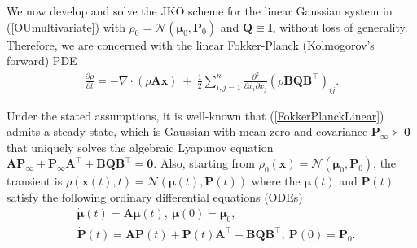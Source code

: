 \documentclass[letterpaper,10pt,twocolumn,conference]{ieeeconf}
\newcommand{\bbx}{{\bm{x}}}
\newcommand{\bbmu}{\bm{\mu}}
\newcommand{\bbP}{\bm{P}}
\begin{document}
We now develop and solve the JKO scheme for the linear Gaussian system in (\ref{OUmultivariate}) with $\rho_{0} = \mathcal{N}\left(\bm{\mu}_{0},\bm{P}_{0}\right)$ and $\bm{Q}\equiv \bm{I}$, without loss of generality. Therefore, we are concerned with the linear Fokker-Planck (Kolmogorov's forward) PDE
\begin{eqnarray}
\displaystyle\frac{\partial\rho}{\partial t} = - \nabla \cdot \left(\rho\bm{A}\bm{x}\right) \: + \: \displaystyle\frac{1}{2}\displaystyle\sum_{i,j=1}^{n}%
\displaystyle\frac{\partial^{2}}{\partial x_{i}\partial x_{j}}\left(\rho\bm{B}\bm{Q}\bm{B}^{\top}\right)_{ij}.
\label{FokkerPlanckLinear}	
\end{eqnarray}

Under the stated assumptions, it is well-known that (\ref{FokkerPlanckLinear}) admits a steady-state, which is Gaussian with mean zero and covariance $\bm{P}_{\infty} \succ \bm{0}$ that uniquely solves the algebraic Lyapunov equation $\bm{A}\bm{P}_{\infty} + \bm{P}_{\infty} \bm{A}^{\top} + \bm{BQB^{\top}} = \bm{0}$. Also, starting from $\rho_{0}(\bm{x})=\mathcal{N}\left(\bm{\mu}_0,\bm{P}_0\right)$, the transient is $\rho(\bm{x}(t),t)=\mathcal{N}\left(\bm{\mu}(t),\bm{P}(t)\right)$ where the $\bbmu(t)$ and $\bbP(t)$ satisfy the following ordinary differential equations (ODEs) \cite[Ch. 3.6]{AstromBook1970}
\begin{subequations}\label{MeanCovODEs}
\begin{align}\label{MeanCovODEsa}
&\dot{\bm{\mu}}(t) = \bm{A}\bm{\mu}(t), \: \bm{\mu}(0) = \bm{\mu}_{0},\\\label{MeanCovODEsb}
&\dot{\bm{P}}(t) = 	\bm{A}\bm{P}(t) + \bm{P}(t) \bm{A}^{\top} + \bm{BQB^{\top}}, \: \bm{P}(0) = \bm{P}_{0}.
\end{align}
\end{subequations}
\end{document}
